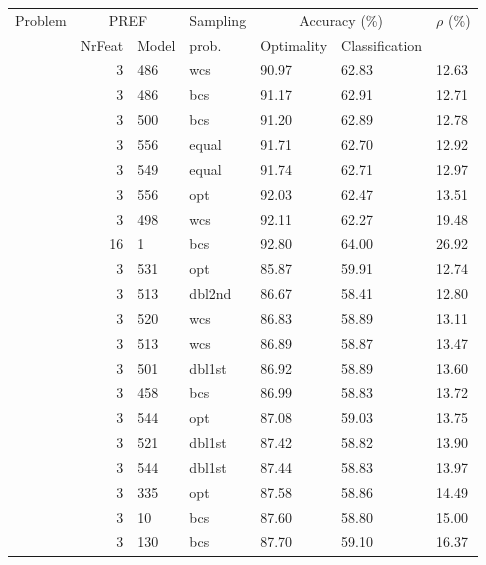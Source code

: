 \centering
\begin{tabular}{cr@{.}lllll}\toprule
	Problem  & \multicolumn{2}{c}{PREF} & Sampling & \multicolumn{2}{c}{Accuracy (\%)} & $\rho$ (\%) \\
	  & NrFeat & Model & prob.  & Optimality & Classification &       \\ 
	\midrule \multirow{8}{*}{\jrnd{10}{10}} 
	  & 3      & 486   & wcs    & 90.97      & 62.83          & 12.63 \\ 
	  & 3      & 486   & bcs    & 91.17      & 62.91          & 12.71 \\ 
	  & 3      & 500   & bcs    & 91.20      & 62.89          & 12.78 \\ 
	  & 3      & 556   & equal  & 91.71      & 62.70          & 12.92 \\ 
	  & 3      & 549   & equal  & 91.74      & 62.71          & 12.97 \\ 
	  & 3      & 556   & opt    & 92.03      & 62.47          & 13.51 \\ 
	  & 3      & 498   & wcs    & 92.11      & 62.27          & 19.48 \\ 
	  & 16     & 1     & bcs    & 92.80      & 64.00          & 26.92 \\ 
	\midrule \multirow{25}{*}{\jrndn{10}{10}} 
	  & 3      & 531   & opt    & 85.87      & 59.91          & 12.74 \\ 
	  & 3      & 513   & dbl2nd & 86.67      & 58.41          & 12.80 \\ 
	  & 3      & 520   & wcs    & 86.83      & 58.89          & 13.11 \\ 
	  & 3      & 513   & wcs    & 86.89      & 58.87          & 13.47 \\ 
	  & 3      & 501   & dbl1st & 86.92      & 58.89          & 13.60 \\ 
	  & 3      & 458   & bcs    & 86.99      & 58.83          & 13.72 \\ 
	  & 3      & 544   & opt    & 87.08      & 59.03          & 13.75 \\ 
	  & 3      & 521   & dbl1st & 87.42      & 58.82          & 13.90 \\ 
	  & 3      & 544   & dbl1st & 87.44      & 58.83          & 13.97 \\ 
	  & 3      & 335   & opt    & 87.58      & 58.86          & 14.49 \\ 
	  & 3      & 10    & bcs    & 87.60      & 58.80          & 15.00 \\ 
	  & 3      & 130   & bcs    & 87.70      & 59.10          & 16.37 \\ 

\end{tabular}
